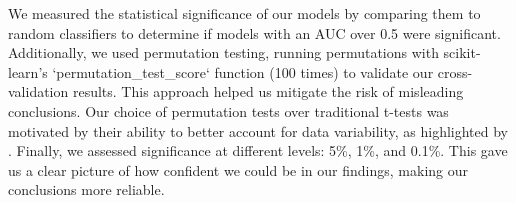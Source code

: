 We measured the statistical significance of our models by comparing them to random classifiers to determine if models with an AUC over 0.5 were significant. Additionally, we used permutation testing, running permutations with scikit-learn's `permutation\_test\_score` function (100 times) to validate our cross-validation results. This approach helped us mitigate the risk of misleading conclusions. Our choice of permutation tests over traditional t-tests was motivated by their ability to better account for data variability, as highlighted by \cite{Nadeau_2003}. Finally, we assessed significance at different levels: 5\%, 1\%, and 0.1\%. This gave us a clear picture of how confident we could be in our findings, making our conclusions more reliable.